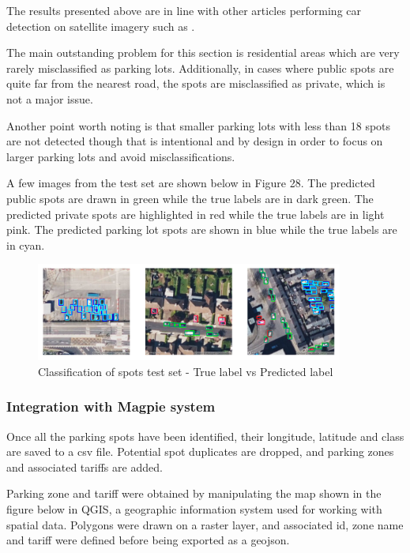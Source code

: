 The results presented above are in line with other articles performing car
detection on satellite imagery such as \cite{similarresults}.

The main outstanding problem for this section is residential areas which are
very rarely misclassified as parking lots. Additionally, in cases where public
spots are quite far from the nearest road, the spots are misclassified as
private, which is not a major issue.

Another point worth noting is that smaller parking lots with less than 18 spots
are not detected though that is intentional and by design in order to focus on
larger parking lots and avoid misclassifications.

A few images from the test set are shown below in Figure 28.
The predicted public spots are drawn in green while the true labels are in dark
green. The predicted private spots are highlighted in red while the true labels
are in light pink. The predicted parking lot spots are shown in blue while the
true labels are in cyan.

\begin{figure}[htbp]
  \centering
  \includegraphics[width=0.9\textwidth]{images/classification-spots-test.png}
  \caption{Classification of spots test set - True label vs Predicted label}
\end{figure}

\newpage{}

\subsubsection{Integration with Magpie system}
Once all the parking spots have been identified, their longitude, latitude and
class are saved to a csv file. Potential spot duplicates are dropped, and
parking zones and associated tariffs are added.

Parking zone and tariff were obtained by manipulating the map shown in the
figure below in QGIS, a geographic information system used for working with
spatial data. Polygons were drawn on a raster layer, and associated id, zone
name and tariff were defined before being exported as a geojson.


